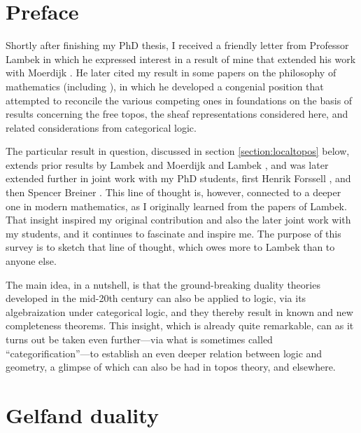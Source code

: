 \documentclass[graybox]{svmult}
\begin{document}
%
%
%
\section*{Preface}

Shortly after finishing my PhD thesis, I received a friendly letter from Professor Lambek in which he expressed interest in a result of mine that extended his work with Moerdijk \cite{LM}. He later cited my result in some papers on the philosophy of mathematics (including \cite{L1,L2}), in which he developed a congenial position that attempted to reconcile the various competing ones in foundations on the basis of results concerning the free topos, the sheaf representations considered here, and related considerations from categorical logic.    

The particular result in question, discussed in section \ref{section:localtopos} below, extends prior results by Lambek and Moerdijk \cite{LM} and Lambek \cite{L2}, and was later extended further in joint work with my  PhD students, first Henrik Forssell \cite{AF, For}, and then Spencer Breiner \cite{AB,B}.  This line of thought is, however, connected to a deeper one in modern mathematics, as I originally learned from the papers of Lambek.  That insight inspired  my  original contribution and also the later joint work with my students, and it continues to fascinate and inspire me.   The purpose of this survey is to sketch that line of thought, which owes more to Lambek than to anyone else.  

The main idea, in a nutshell, is that the ground-breaking duality theories developed in the mid-20th century can also be applied to logic, via its algebraization under categorical logic, and they thereby result in known and new completeness theorems.  This insight, which is already quite remarkable, can as it turns out be taken even further---via what is sometimes called ``categorification''---to establish an even deeper relation between logic and geometry, a glimpse of which can also be had in topos theory, and elsewhere.

\section{Gelfand duality}
\end{document}
